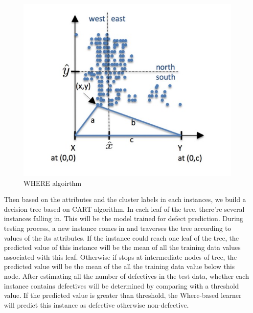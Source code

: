\documentclass{sig-alternative}
\begin{document}
\begin{figure}[!ht]
\includegraphics[scale=0.5]{where.png}
\caption{WHERE algoirthm }
\label{Where}
\end{figure}
Then based on the attributes and the cluster labels in each instances,  we build a 
decision tree based on CART algorithm. In each leaf of the tree, there're several instances 
falling in. This will be the model trained for defect prediction. During testing process, a new 
instance comes in and traverses the tree according to 
values of the its attributes. If the instance could reach one leaf of the tree, the predicted value 
of this instance will be the mean  of all the training data values associated with this leaf. 
Otherwise if stops at intermediate nodes of tree, the predicted value will be the mean of the all 
the training data value below this node. After estimating all the number of defectives in the test 
data, whether each instance contains defectives will be determined by comparing with a threshold value. If the predicted value is greater than threshold, the Where-based learner will predict this instance as defective otherwise non-defective.


\end{document}
